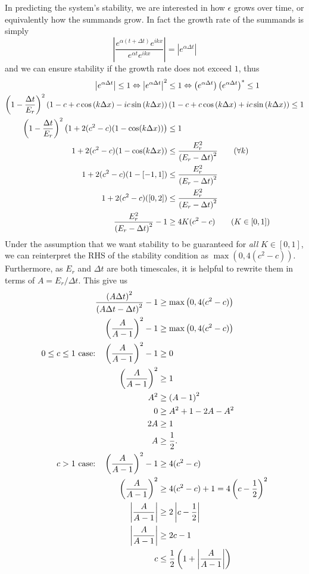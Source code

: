 \documentclass[11pt]{article}
\begin{document}
In predicting the system's stability, we are interested in how $\epsilon$ grows over time, or equivalently how the summands grow. In fact the growth rate of the summands is simply
\[
\left|\frac{e^{\alpha\left(t+\Delta t\right)}e^{ikx}}{e^{\alpha t}e^{ikx}}\right| = \left|e^{\alpha\Delta t}\right|
\]
and we can ensure stability if the growth rate does not exceed $1$, thus
\begin{align}
\left|e^{\alpha\Delta t}\right|\leq 1 \Leftrightarrow
\left|e^{\alpha\Delta t}\right|^2&\leq 1 \Leftrightarrow
\left(e^{\alpha\Delta t}\right)\left(e^{\alpha\Delta t}\right)^*\leq 1 \nonumber\\
\left(1-\frac{\Delta t}{E_r}\right)^2
\left(1-c+c\cos\left(k\Delta x\right)-ic\sin\left(k\Delta x\right)\right) &
\left(1-c+c\cos\left(k\Delta x\right)+ic\sin\left(k\Delta x\right)\right)\leq 1 \nonumber\\
\left(1-\frac{\Delta t}{E_r}\right)^2\left(1+2(c^2-c)(1-\cos(k\Delta x))\right) &\leq 1 \nonumber\\
1+2(c^2-c)(1-\cos(k\Delta x)) &\leq \frac{E_r^2}{\left(E_r-\Delta t\right)^2}		\text{\quad\quad($\forall k$)} \nonumber\\
1+2(c^2-c)(1-[-1,1]) &\leq \frac{E_r^2}{\left(E_r-\Delta t\right)^2} \nonumber\\
1+2(c^2-c)([0,2]) &\leq \frac{E_r^2}{\left(E_r-\Delta t\right)^2} \nonumber\\
\frac{E_r^2}{\left(E_r-\Delta t\right)^2}-1 &\geq 4K(c^2-c)				\text{\quad\quad($K\in[0,1]$)} \label{eq:stable}
\end{align}
Under the assumption that we want stability to be guaranteed for \emph{all} $K\in[0,1]$, we can reinterpret the RHS of the stability condition as $\max\left(0,4(c^2-c)\right)$. Furthermore, as $E_r$ and $\Delta t$ are both timescales, it is helpful to rewrite them in terms of $A=E_r/\Delta t$. This give us
\begin{align}
\frac{\left(A\Delta t\right)^2}{\left(A\Delta t-\Delta t\right)^2}-1 &\geq \max\left(0,4(c^2-c)\right) \nonumber\\
\left(\frac{A}{A-1}\right)^2 -1 &\geq \max\left(0,4(c^2-c)\right) \nonumber\\
\text{$0\leq c\leq 1$ case:\quad} \left(\frac{A}{A-1}\right)^2 -1 &\geq 0 \nonumber\\
\left(\frac{A}{A-1}\right)^2 &\geq 1 \nonumber\\
A^2 &\geq \left(A-1\right)^2 \nonumber\\
0 &\geq A^2 + 1 - 2A - A^2 \nonumber\\
2A &\geq 1 \nonumber\\
A &\geq \frac{1}{2}.		\label{eq:stab1} \\
\text{$c>1$ case:\quad} \left(\frac{A}{A-1}\right)^2 -1 &\geq 4(c^2-c)		\label{eq:stab4} \\
\left(\frac{A}{A-1}\right)^2 &\geq 4(c^2-c)+1 = 4\left(c-\frac{1}{2}\right)^2 \nonumber \\
\left|\frac{A}{A-1}\right| &\geq 2\left|c-\frac{1}{2}\right| \nonumber \\
\left|\frac{A}{A-1}\right| &\geq 2c-1 \nonumber \\
c &\leq \frac{1}{2}\left(1 + \left|\frac{A}{A-1}\right|\right) 	\label{eq:stab5}
\end{align}
\end{document}
